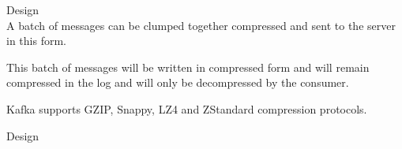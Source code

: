 \begin{frame}[plain,t]{Design} %
     \\
    \vspace{2ex}
    A batch of messages can be clumped together compressed and sent to the server in this form. 
    
    \vspace{2ex}
    This batch of messages will be written in compressed form and will remain compressed in the log and will only be decompressed by the consumer.
    
    \vspace{2ex}
    Kafka supports GZIP, Snappy, LZ4 and ZStandard compression protocols.
    
    
\end{frame}
\begin{frame}[plain,t]{Design} %
     \\
    \vspace{2ex}
    
    
\end{frame}
